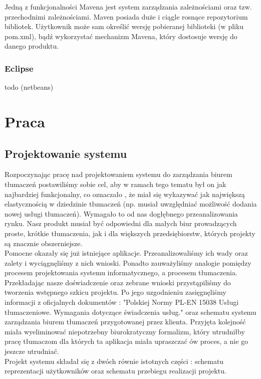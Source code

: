 \documentclass[licencjacka]{pracamgr}
\begin{document}
Jedną z funkcjonalności Mavena jest system zarządzania zależnościami oraz tzw. przechodnimi zależnościami.
Maven posiada duże i ciągle rosnące repozytorium bibliotek. Użytkownik może sam określić wersję pobieranej biblioteki (w pliku pom.xml), bądź wykorzystać mechanizm Mavena, 
który dostosuje wersję do danego produktu.
\subsection{Eclipse}
todo (netbeans)
\chapter{Praca}
\section{Projektowanie systemu}
Rozpoczynając pracę nad projektowaniem systemu do zarządzania biurem tłumaczeń postawiliśmy sobie cel, aby w ramach tego tematu był on jak najbardziej funkcjonalny,
co oznaczało , że miał się wykazywać jak największą elastycznością w dziedzinie tłumaczeń (np. musiał uwzględniać możliwość dodania nowej usługi tłumaczeń). 
Wymagało to od nas dogłębnego przeanalizowania rynku. Nasz produkt musiał być odpowiedni dla małych biur prowadzących proste, krótkie tłumaczenia, jak i dla większych 
przedsiębiorstw, których projekty są znacznie obszerniejsze.\\


Pomocne okazały się już istniejące aplikacje. Przeanalizowaliśmy ich wady oraz zalety i wyciągnęliśmy z nich wnioski. Ponadto zauważyliśmy analogie pomiędzy procesem projektowania
systemu informatycznego, a procesem tłumaczenia. Przekładając nasze doświadczenie oraz zebrane wnioski przystąpiliśmy do tworzenia wstępnego szkicu projektu. 
Po jego uzgodnieniu zasięgnęliśmy informacji z oficjalnych dokumentów : "Polskiej Normy PL-EN 15038 Usługi tłumaczeniowe. Wymagania dotyczące świadczenia usług." oraz
schematu systemu zarządzania biurem tłumaczeń przygotowanej przez klienta.
Przyjęta kolejność miała wyeliminować niepotrzebny biurokratyczny formalizm, który utrudniłby pracę tłumaczom dla których ta aplikacja miała upraszczać ów proces, a nie go jeszcze utrudniać.\\


Projekt systemu składał się z dwóch równie istotnych części : schematu reprezentacji użytkowników oraz schematu przebiegu realizacji projektu.\\
\end{document}
